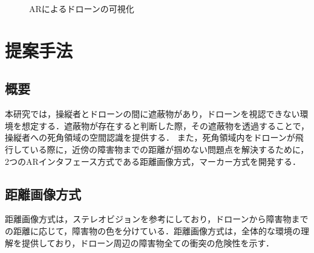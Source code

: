 \documentclass[a4j,10pt,twocolumn]{jarticle}
\begin{document}
\begin{figure}[t]
\begin{center}
  \vspace{-2mm}
  \caption{ARによるドローンの可視化}
  \label{fig:flow}
\end{center}
\end{figure}
\section{提案手法}
\subsection{概要}\label{}
本研究では，操縦者とドローンの間に遮蔽物があり，ドローンを視認できない環境を想定する．遮蔽物が存在すると判断した際，その遮蔽物を透過することで，操縦者への死角領域の空間認識を提供する．
また，死角領域内をドローンが飛行している際に，近傍の障害物までの距離が掴めない問題点を解決するために，2つのARインタフェース方式である距離画像方式，マーカー方式を開発する．

\subsection{距離画像方式}
距離画像方式は，ステレオビジョンを参考にしており，ドローンから障害物までの距離に応じて，障害物の色を分けている．距離画像方式は，全体的な環境の理解を提供しており，ドローン周辺の障害物全ての衝突の危険性を示す．
\end{document}
